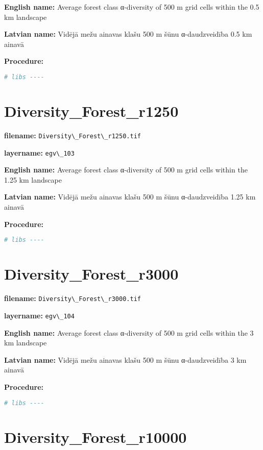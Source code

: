 \documentclass[
]{book}
\newcommand{\passthrough}[1]{#1}
\begin{document}
\textbf{English name:} Average forest class α-diversity of 500 m grid cells within the 0.5 km landscape

\textbf{Latvian name:} Vidējā mežu ainavas klašu 500 m šūnu α-daudzveidība 0.5 km ainavā

\textbf{Procedure:}

\begin{lstlisting}[language=R]
# libs ----
\end{lstlisting}

\section{Diversity\_Forest\_r1250}\label{ch06.103}

\textbf{filename:} \passthrough{\lstinline!Diversity\_Forest\_r1250.tif!}

\textbf{layername:} \passthrough{\lstinline!egv\_103!}

\textbf{English name:} Average forest class α-diversity of 500 m grid cells within the 1.25 km landscape

\textbf{Latvian name:} Vidējā mežu ainavas klašu 500 m šūnu α-daudzveidība 1.25 km ainavā

\textbf{Procedure:}

\begin{lstlisting}[language=R]
# libs ----
\end{lstlisting}

\section{Diversity\_Forest\_r3000}\label{ch06.104}

\textbf{filename:} \passthrough{\lstinline!Diversity\_Forest\_r3000.tif!}

\textbf{layername:} \passthrough{\lstinline!egv\_104!}

\textbf{English name:} Average forest class α-diversity of 500 m grid cells within the 3 km landscape

\textbf{Latvian name:} Vidējā mežu ainavas klašu 500 m šūnu α-daudzveidība 3 km ainavā

\textbf{Procedure:}

\begin{lstlisting}[language=R]
# libs ----
\end{lstlisting}

\section{Diversity\_Forest\_r10000}\label{ch06.105}
\end{document}
